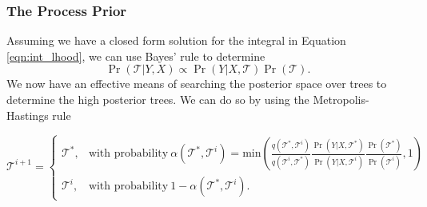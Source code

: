 \documentclass{article}
\begin{document}
\subsubsection{The Process Prior}

Assuming we have a closed form solution for the integral in Equation \ref{eqn:int_lhood}, we can use Bayes' rule to determine 
\begin{equation}\label{eqn:tree_post}
\Pr(\mathcal{T} \vert Y , X) \propto \Pr(Y \vert X ,\mathcal{T})\Pr(\mathcal{T}).
\end{equation} 
We now have an effective means of searching the posterior space over trees to determine the high posterior trees. We can do so by using the Metropolis-Hastings rule 

\begin{equation}\label{eqn:MHrule}
\mathcal{T}^{i+1} =\begin{cases}
\mathcal{T}^*, & \text{with probability}\ \alpha(\mathcal{T}^*, \mathcal{T}^i) = \text{min}\left(\frac{q(\mathcal{T}^*, \mathcal{T}^i)}{q(\mathcal{T}^i, \mathcal{T}^*)}\frac{\Pr(Y\vert X, \mathcal{T}^*)}{\Pr(Y\vert X,\mathcal{T}^i)}\frac{\Pr(\mathcal{T}^{*})}{\Pr(\mathcal{T}^i)},1 \right) \\
\mathcal{T}^{i}, & \text{with probability}\ 1-\alpha(\mathcal{T}^*, \mathcal{T}^i).
\end{cases} \end{equation}
\end{document}
